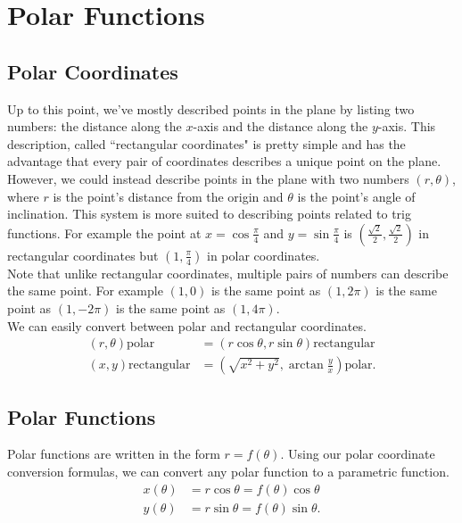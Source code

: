 \section{Polar Functions}
\subsection{Polar Coordinates}
Up to this point, we've mostly described points in the plane by listing two numbers: the distance along the $x$-axis and the distance along the $y$-axis.
This description, called ``rectangular coordinates" is pretty simple and has the advantage that every pair of coordinates describes a unique point on the plane. \\


However, we could instead describe points in the plane with two numbers $(r,\theta)$, where $r$ is the point's distance from the origin and $\theta$ is the point's angle of inclination.
This system is more suited to describing points related to trig functions.
For example the point at $x=\cos{\frac{\pi}{4}}$ and $y=\sin{\frac{\pi}{4}}$ is $\left(\frac{\sqrt{2}}{2},\frac{\sqrt{2}}{2}\right)$ in rectangular coordinates but $\left(1,\frac{\pi}{4}\right)$ in polar coordinates. \\


Note that unlike rectangular coordinates, multiple pairs of numbers can describe the same point.
For example $\left(1,0\right)$ is the same point as $\left(1,2\pi\right)$ is the same point as $\left(1,-2\pi\right)$ is the same point as $\left(1,4\pi\right)$. \\


We can easily convert between polar and rectangular coordinates.
\begin{align*}
	\left(r,\theta\right) \text{polar} &= \left(r\cos{\theta}, r\sin{\theta}\right) \text{rectangular} \\
	\left(x,y\right) \text{rectangular} &= \left(\sqrt{x^2+y^2}, \arctan{\frac{y}{x}}\right) \text{polar}.
\end{align*}

\subsection{Polar Functions}
Polar functions are written in the form $r = f(\theta)$.
Using our polar coordinate conversion formulas, we can convert any polar function to a parametric function.
\begin{align*}
	x(\theta) &= r\cos{\theta} = f(\theta)\cos{\theta} \\
	y(\theta) &= r\sin{\theta} = f(\theta)\sin{\theta}.
\end{align*}

